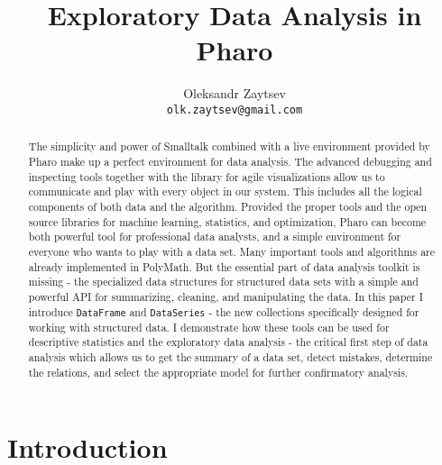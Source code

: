 \documentclass{article}
\title{Exploratory Data Analysis in Pharo}
\author{
  Oleksandr Zaytsev\\
  \texttt{olk.zaytsev@gmail.com}
}
\date{}
\begin{document}
\maketitle


\begin{abstract}

\noindent The simplicity and power of Smalltalk combined with a live environment provided by Pharo make up a perfect environment for data analysis. The advanced debugging and inspecting tools together with the library for agile visualizations allow us to communicate and play with every object in our system. This includes all the logical components of both data and the algorithm. Provided the proper tools and the open source libraries for machine learning, statistics, and optimization, Pharo can become both powerful tool for professional data analysts, and a simple environment for everyone who wants to play with a data set. Many important tools and algorithms are already implemented in PolyMath. But the essential part of data analysis toolkit is missing - the specialized data structures for structured data sets with a simple and powerful API for summarizing, cleaning, and manipulating the data. In this paper I introduce \texttt{DataFrame} and \texttt{DataSeries} - the new collections specifically designed for working with structured data. I demonstrate how these tools can be used for descriptive statistics and the exploratory data analysis - the critical first step of data analysis which allows us to get the summary of a data set, detect mistakes, determine the relations, and select the appropriate model for further confirmatory analysis.
\end{abstract}


\section{Introduction}
\label{sec:intro}

%
%
%
%
\end{document}
